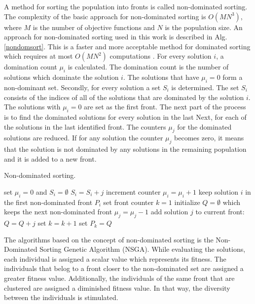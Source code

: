 A method for sorting the population into fronts is called non-dominated sorting. 
The complexity of the basic approach for non-dominated sorting is $O(MN^3)$, where $M$ is the number of objective functions and $N$ is the population size.
An approach for non-dominated sorting used in this work is described in Alg. 
\ref{nondomsort}. This is a faster and more acceptable method for dominated sorting which requires at most $O(MN^2)$ computations \cite{deb2001multi}.
For every solution $i$, a domination count $\mu_i$ is calculated. The domination count is the number of solutions which dominate the solution $i$. The solutions that have $\mu_i = 0$ form a non-dominant set.
Secondly, for every solution a set $S_i$ is determined. The set $S_i$ consists of the indices of all of the solutions that are dominated by the solution $i$. 
The solutions with $\mu_i=0$ are set as the first front. 
The next part of the process is to find the dominated solutions for every solution in the last 
Next, for each of the solutions in the last identified front. 
The counters $\mu_j$ for the dominated solutions are reduced. 
If for any solution the counter $\mu_j$ becomes zero, it means that the solution is not dominated by any solutions in the remaining population and it is added to a new front. 

\begin{algorithm}
\caption{Non-dominated sorting.\label{nondomsort}}
\begin{algorithmic}[1]
\State set $\mu_i = 0$ and $S_i = \emptyset$
\EndFor
{}
\State $S_i = S_i + j$
\State increment counter $\mu_i = \mu_i + 1$
\EndIf
{} 
\State keep solution $i$ in the first non-dominated front $P_i$
\State set front counter $k=1$
\EndIf
\EndFor
{}
\State initialize $Q = \emptyset$ which keeps the next non-dominated front
\State $\mu_j = \mu_j - 1$
\State add solution $j$ to current front: $Q = Q + j$
\EndIf
\EndFor
\State set $k = k+1$
\State set $P_k = Q$
\EndWhile
\end{algorithmic}
\end{algorithm}

The algorithms based on the concept of non-dominated sorting is the Non-Dominated Sorting Genetic Algorithm (NSGA). 
While evaluating the solutions, each individual is assigned a scalar value which represents its fitness. 
The individuals that belog to a front closer to the non-dominated set are assigned a greater fitness value. Additionally, the individuals of the same front that are clustered are assigned a diminished fitness value. 
In that way, the diversity between the individuals is stimulated. 


